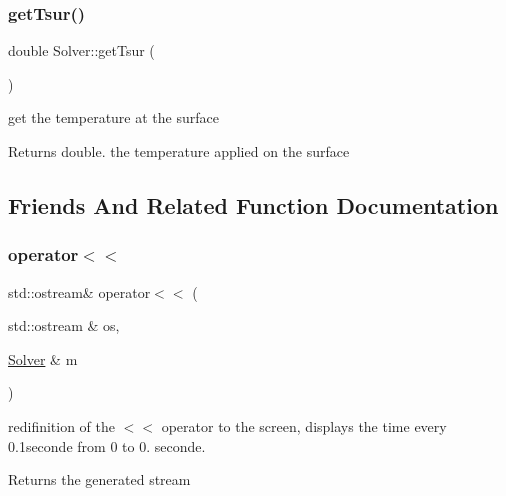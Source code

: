 \subsubsection{\texorpdfstring{get\+Tsur()}{getTsur()}}
{\footnotesize\ttfamily double Solver\+::get\+Tsur (\begin{DoxyParamCaption}{ }\end{DoxyParamCaption})}

get the temperature at the surface
\begin{DoxyItemize}
\item \begin{DoxyReturn}{Returns}
double. the temperature applied on the surface 
\end{DoxyReturn}

\end{DoxyItemize}

\subsection{Friends And Related Function Documentation}
\mbox{\label{classSolver_a6971051b04802402e5cbf2fda5041041}} 
\subsubsection{\texorpdfstring{operator$<$$<$}{operator<<}\hspace{0.1cm}{\footnotesize\ttfamily [1/2]}}
{\footnotesize\ttfamily std\+::ostream\& operator$<$$<$ (\begin{DoxyParamCaption}\item[{std\+::ostream \&}]{os,  }\item[{\mbox{\hyperlink{classSolver}{Solver}} \&}]{m }\end{DoxyParamCaption})\hspace{0.3cm}{\ttfamily [friend]}}

redifinition of the $<$$<$ operator to the screen, displays the time every 0.\+1seconde from 0 to 0. seconde. \begin{DoxyReturn}{Returns}
the generated stream 
\end{DoxyReturn}
\mbox{\label{classSolver_a1771538d8a3459fdfb2cc37729141e22}} 
